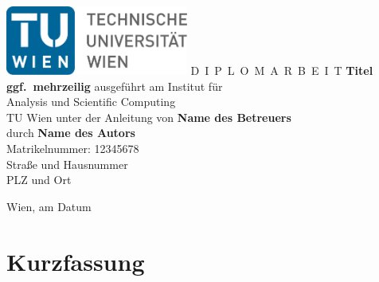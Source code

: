 

\begin{titlepage}
  \begin{center}
    \includegraphics[width=0.45\textwidth]{figures/TULogo.pdf}
    \vskip 1cm
      {\LARGE D~\Large I~P~L~O~M~A~R~B~E~I~T}
    \vskip 8mm
      {\huge\bfseries\color{change}Titel \\[1ex] ggf.\ mehrzeilig}
    \vskip 1cm
    \large
    ausgef\"uhrt am
    \vskip 0.75cm
      {\Large Institut f\"ur\\[1ex] Analysis und Scientific Computing}\\[1ex]
    {\Large TU Wien}
    \vskip0.75cm
    unter der Anleitung von
    \vskip0.75cm
    {\Large\bfseries\color{change}Name des Betreuers}\\[1ex]
    \vskip 0.5cm
    durch
    \vskip 0.5cm
      {\Large\bfseries\color{change}Name des Autors}\\[1ex]
    Matrikelnummer: {\color{change}12345678}\\[1ex]
    {\color{change}Straße und Hausnummer}\\[1ex]
    {\color{change}PLZ und Ort}
  \end{center}

  \vfill

  \small
  Wien, am {\color{change} Datum} %
  \vspace*{-15mm}
\end{titlepage}

\cleardoublepage


\chapter*{Kurzfassung}
\thispagestyle{empty}

